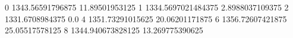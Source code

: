 0 1343.56591796875 11.89501953125
1 1334.5697021484375 2.8988037109375
2 1331.6708984375 0.0
4 1351.73291015625 20.06201171875
6 1356.72607421875 25.05517578125
8 1344.940673828125 13.269775390625
